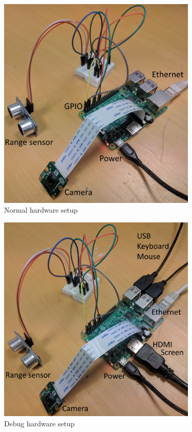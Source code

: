 \begin{figure}[H]
  \centering
  \includegraphics[width=0.85\textwidth]{fig/setup_normal}
  \caption{Normal hardware setup}
  \label{fig:setup_n}
\end{figure}
\begin{figure}[H]
  \centering
  \includegraphics[width=0.85\textwidth]{fig/setup_debug}
  \caption{Debug hardware setup}
  \label{fig:setup_d}
\end{figure}

